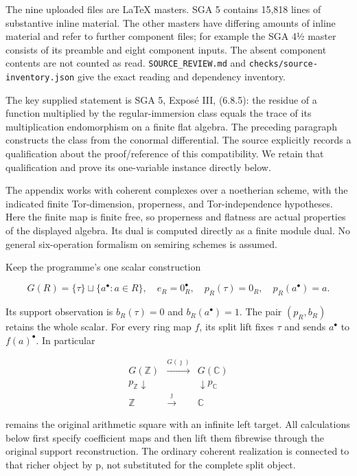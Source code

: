 \documentclass[
  11pt,
]{article}
\begin{document}
The nine uploaded files are LaTeX masters. SGA 5 contains 15,818 lines
of substantive inline material. The other masters have differing amounts
of inline material and refer to further component files; for example the
SGA 4½ master consists of its preamble and eight component inputs. The
absent component contents are not counted as read.
\texttt{SOURCE\_REVIEW.md} and \texttt{checks/source-inventory.json}
give the exact reading and dependency inventory.

The key supplied statement is SGA 5, Exposé III, (6.8.5): the residue of
a function multiplied by the regular-immersion class equals the trace of
its multiplication endomorphism on a finite flat algebra. The preceding
paragraph constructs the class from the conormal differential. The
source explicitly records a qualification about the proof/reference of
this compatibility. We retain that qualification and prove its
one-variable instance directly below.

The appendix works with coherent complexes over a noetherian scheme,
with the indicated finite Tor-dimension, properness, and
Tor-independence hypotheses. Here the finite map is finite free, so
properness and flatness are actual properties of the displayed algebra.
Its dual is computed directly as a finite module dual. No general
six-operation formalism on semiring schemes is assumed.

Keep the programme's one scalar construction

\[
G(R)=\{\tau\}\sqcup\{a^\bullet:a\in R\},
\quad e_R=0_R^\bullet,
\quad p_R(\tau)=0_R,\quad p_R(a^\bullet)=a.
\tag{3}
\]

Its support observation is \(b_R(\tau)=0\) and \(b_R(a^\bullet)=1\). The
pair \((p_R,b_R)\) retains the whole scalar. For every ring map \(f\),
its split lift fixes \(\tau\) and sends \(a^\bullet\) to
\(f(a)^\bullet\). In particular

\[
\begin{array}{ccc}
G(\mathbb Z)&\xrightarrow{G(\jmath)}&G(\mathbb C)\\
p_{\mathbb Z}\downarrow&&\downarrow p_{\mathbb C}\\
\mathbb Z&\xrightarrow{\jmath}&\mathbb C
\end{array}
\tag{4}
\]

remains the original arithmetic square with an infinite left target. All
calculations below first specify coefficient maps and then lift them
fibrewise through the original support reconstruction. The ordinary
coherent realization is connected to that richer object by p, not
substituted for the complete split object.
\end{document}
